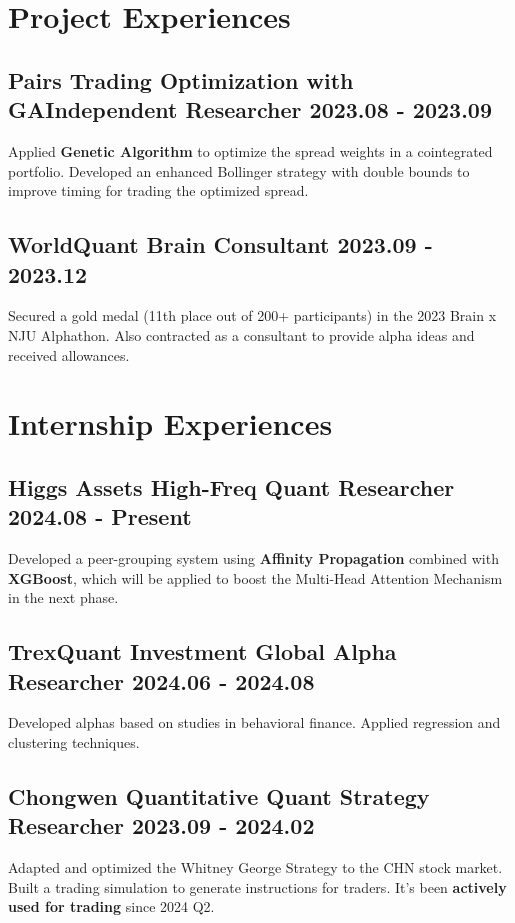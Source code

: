\documentclass[a4paper]{article}
\begin{document}

\section{Project Experiences} %
\subsection{Pairs Trading Optimization with GA\normalfont \hfill Independent Researcher \hspace{40pt} 2023.08 - 2023.09}
Applied \textbf{Genetic Algorithm} to optimize the spread weights in a cointegrated portfolio. Developed an enhanced Bollinger strategy with double bounds to improve timing for trading the optimized spread.

\subsection{WorldQuant Brain \normalfont \hfill Consultant\hspace{40pt} 2023.09 - 2023.12}
Secured a gold medal (11th place out of 200+ participants) in the 2023 Brain x NJU Alphathon. Also contracted as a consultant to provide alpha ideas and received allowances.

\section{Internship Experiences} %
\subsection{Higgs Assets \normalfont \hfill High-Freq Quant Researcher \hspace{40pt} 2024.08 - Present}
Developed a peer-grouping system using \textbf{Affinity Propagation} combined with \textbf{XGBoost}, which will be applied to boost the Multi-Head Attention Mechanism in the next phase. 
\subsection{TrexQuant Investment \normalfont \hfill Global Alpha Researcher \hspace{40pt} 2024.06 - 2024.08}
Developed alphas based on studies in behavioral finance. Applied regression and clustering techniques.
\subsection{Chongwen Quantitative \normalfont\hfill Quant Strategy Researcher  \hspace{40pt} 2023.09 - 2024.02}
Adapted and optimized the Whitney George Strategy to the CHN stock market. Built a trading simulation to generate instructions for traders. It's been \textbf{actively used for trading }since 2024 Q2.
\end{document}
